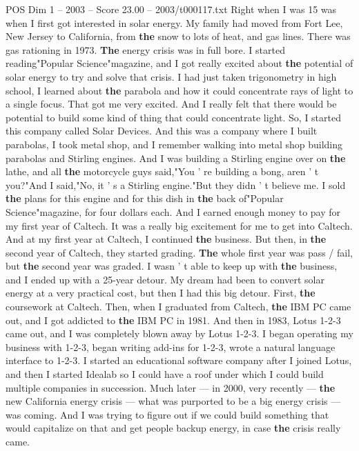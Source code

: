 \begin{textsample}{POS Dim 1 – 2003 – Score 23.00 – 2003/t000117.txt}  \label{ex:f1_pos_004}
Right when I was 15 was when I first got interested in solar energy.
My family had moved from Fort Lee, New Jersey to California, from \textbf{the} snow to lots of heat, and gas lines.
There was gas rationing in 1973. \textbf{The} energy crisis was in full bore.
I started reading"Popular Science"magazine, and I got really excited about \textbf{the} potential of solar energy to try and solve that crisis.
I had just taken trigonometry in high school, I learned about \textbf{the} parabola and how it could concentrate rays of light to a single focus.
That got me very excited.
And I really felt that there would be potential to build some kind of thing that could concentrate light.
So, I started this company called Solar Devices.
And this was a company where I built parabolas, I took metal shop, and I remember walking into metal shop building parabolas and Stirling engines.
And I was building a Stirling engine over on \textbf{the} lathe, and all \textbf{the} motorcycle guys said,"You ' re building a bong, aren ' t you?"And I said,"No, it ' s a Stirling engine."But they didn ' t believe me.
I sold \textbf{the} plans for this engine and for this dish in \textbf{the} back of"Popular Science"magazine, for four dollars each.
And I earned enough money to pay for my first year of Caltech.
It was a really big excitement for me to get into Caltech.
And at my first year at Caltech, I continued \textbf{the} business.
But then, in \textbf{the} second year of Caltech, they started grading. \textbf{The} whole first year was pass / fail, but \textbf{the} second year was graded.
I wasn ' t able to keep up with \textbf{the} business, and I ended up with a 25-year detour.
My dream had been to convert solar energy at a very practical cost, but then I had this big detour.
First, \textbf{the} coursework at Caltech.
Then, when I graduated from Caltech, \textbf{the} IBM PC came out, and I got addicted to \textbf{the} IBM PC in 1981.
And then in 1983, Lotus 1-2-3 came out, and I was completely blown away by Lotus 1-2-3.
I began operating my business with 1-2-3, began writing add-ins for 1-2-3, wrote a natural language interface to 1-2-3.
I started an educational software company after I joined Lotus, and then I started Idealab so I could have a roof under which I could build multiple companies in succession.
Much later — in 2000, very recently — \textbf{the} new California energy crisis — what was purported to be a big energy crisis — was coming.
And I was trying to figure out if we could build something that would capitalize on that and get people backup energy, in case \textbf{the} crisis really came.

\end{textsample}
